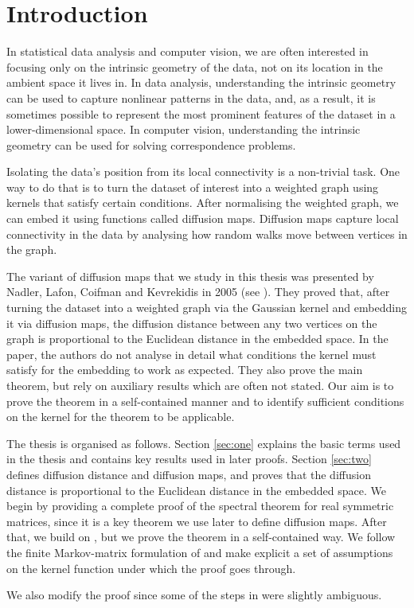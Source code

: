 \section*{Introduction}


In statistical data analysis and computer vision, we are often interested in focusing only on the intrinsic geometry of the data, not on its location in the ambient space it lives in. In data analysis, understanding the intrinsic geometry can be used to capture nonlinear patterns in the data, and, as a result, it is sometimes possible to represent the most prominent features of the dataset in a lower-dimensional space. In computer vision, understanding the intrinsic geometry can be used for solving correspondence problems.

Isolating the data's position from its local connectivity is a non-trivial task. One way to do that is to turn the dataset of interest into a weighted graph using kernels that satisfy certain conditions. After normalising the weighted graph, we can embed it using functions called diffusion maps. Diffusion maps capture local connectivity in the data by analysing how random walks move between vertices in the graph.

The variant of diffusion maps that we study in this thesis was presented by Nadler, Lafon, Coifman and Kevrekidis in 2005 (see \cite{nips:dif_maps}). They proved that, after turning the dataset into a weighted graph via the Gaussian kernel and embedding it via diffusion maps, the diffusion distance between any two vertices on the graph is proportional to the Euclidean distance in the embedded space. In the paper, the authors do not analyse in detail what conditions the kernel must satisfy for the embedding to work as expected. They also prove the main theorem, but rely on auxiliary results which are often not stated. Our aim is to prove the theorem in a self-contained manner and to identify sufficient conditions on the kernel for the theorem to be applicable.

The thesis is organised as follows. Section \ref{sec:one} explains the basic terms used in the thesis and contains key results used in later proofs. Section \ref{sec:two} defines diffusion distance and diffusion maps, and proves that the diffusion distance is proportional to the Euclidean distance in the embedded space. We begin by providing a complete proof of the spectral theorem for real symmetric matrices, since it is a key theorem we use later to define diffusion maps. After that, we build on \cite{nips:dif_maps}, but we prove the theorem in a self-contained way. We follow the finite Markov-matrix formulation of \cite{nips:dif_maps} and make explicit a set of assumptions on the kernel function under which the proof goes through.

We also modify the proof since some of the steps in \cite{nips:dif_maps} were slightly ambiguous.

